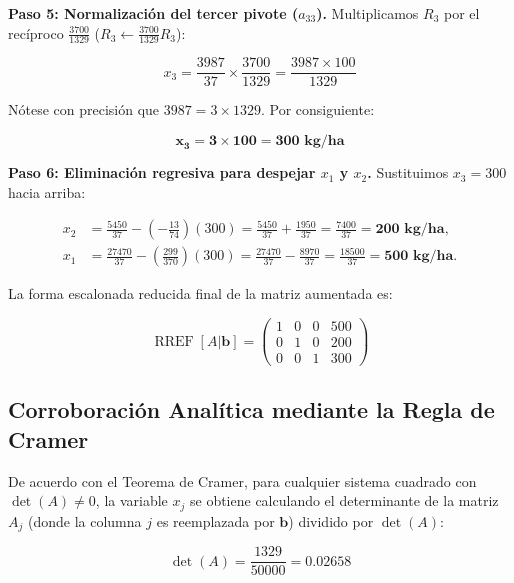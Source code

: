 \noindent\textbf{Paso 5: Normalización del tercer pivote ($a_{33}$).} Multiplicamos $R_3$ por el recíproco $\frac{3700}{1329}$ ($R_3 \leftarrow \frac{3700}{1329} R_3$):

\begin{equation}
x_3 = \frac{3987}{37} \times \frac{3700}{1329} = \frac{3987 \times 100}{1329}
\end{equation}

Nótese con precisión que $3987 = 3 \times 1329$. Por consiguiente:

\begin{equation}
\mathbf{x_3 = 3 \times 100 = 300\text{ kg/ha}}
\end{equation}

\noindent\textbf{Paso 6: Eliminación regresiva para despejar $x_1$ y $x_2$.} Sustituimos $x_3 = 300$ hacia arriba:

\begin{align}
x_2 &= \frac{5450}{37} - \left(-\frac{13}{74}\right)(300) = \frac{5450}{37} + \frac{1950}{37} = \frac{7400}{37} = \mathbf{200\text{ kg/ha}}, \\
x_1 &= \frac{27470}{37} - \left(\frac{299}{370}\right)(300) = \frac{27470}{37} - \frac{8970}{37} = \frac{18500}{37} = \mathbf{500\text{ kg/ha}}.
\end{align}

La forma escalonada reducida final de la matriz aumentada es:

\begin{equation}
\operatorname{RREF}[A|\mathbf{b}] =
\left(\begin{array}{ccc|c}
1 & 0 & 0 & 500 \\
0 & 1 & 0 & 200 \\
0 & 0 & 1 & 300
\end{array}\right)
\end{equation}

\subsection{Corroboración Analítica mediante la Regla de Cramer}

De acuerdo con el Teorema de Cramer, para cualquier sistema cuadrado con $\det(A) \neq 0$, la variable $x_j$ se obtiene calculando el determinante de la matriz $A_j$ (donde la columna $j$ es reemplazada por $\mathbf{b}$) dividido por $\det(A)$:

\begin{equation}
\det(A) = \frac{1329}{50000} = 0.02658
\end{equation}


